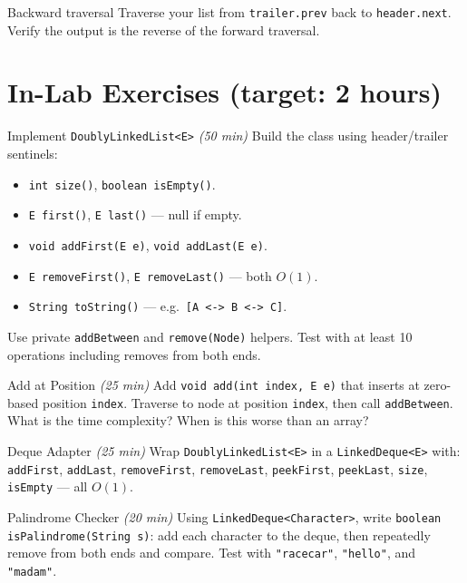 \documentclass[11pt]{article}
\begin{document}
\begin{tryit}{Backward traversal}
Traverse your list from \texttt{trailer.prev} back to \texttt{header.next}.
Verify the output is the reverse of the forward traversal.
\end{tryit}

\section*{In-Lab Exercises (target: 2 hours)}

\begin{labexercise}{Implement \texttt{DoublyLinkedList<E>} \hfill {\small \itshape (50 min)}}
Build the class using header/trailer sentinels:
\begin{itemize}[leftmargin=*,nosep]
  \item \texttt{int size()}, \texttt{boolean isEmpty()}.
  \item \texttt{E first()}, \texttt{E last()} --- null if empty.
  \item \texttt{void addFirst(E e)}, \texttt{void addLast(E e)}.
  \item \texttt{E removeFirst()}, \texttt{E removeLast()} --- both $O(1)$.
  \item \texttt{String toString()} --- e.g.\ \texttt{[A <-> B <-> C]}.
\end{itemize}
Use private \texttt{addBetween} and \texttt{remove(Node)} helpers.
Test with at least 10 operations including removes from both ends.
\end{labexercise}

\begin{labexercise}{Add at Position \hfill {\small \itshape (25 min)}}
Add \texttt{void add(int index, E e)} that inserts at zero-based position \texttt{index}.
Traverse to node at position \texttt{index}, then call \texttt{addBetween}.
What is the time complexity? When is this worse than an array?
\end{labexercise}

\begin{labexercise}{Deque Adapter \hfill {\small \itshape (25 min)}}
Wrap \texttt{DoublyLinkedList<E>} in a \texttt{LinkedDeque<E>} with:
\texttt{addFirst}, \texttt{addLast}, \texttt{removeFirst}, \texttt{removeLast},
\texttt{peekFirst}, \texttt{peekLast}, \texttt{size}, \texttt{isEmpty} --- all $O(1)$.
\end{labexercise}

\begin{labexercise}{Palindrome Checker \hfill {\small \itshape (20 min)}}
Using \texttt{LinkedDeque<Character>}, write \texttt{boolean isPalindrome(String s)}:
add each character to the deque, then repeatedly remove from both ends and compare.
Test with \texttt{"racecar"}, \texttt{"hello"}, and \texttt{"madam"}.
\end{labexercise}
\end{document}
